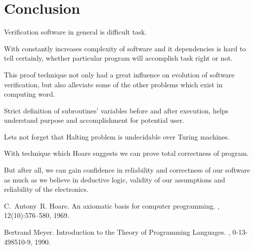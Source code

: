 \documentclass[twoside,twocolumn]{article}
\begin{document}
\section{Conclusion}

Verification software in general is difficult task.

With constantly increases complexity of software and it dependencies is hard to
tell certainly, whether particular program will accomplish task right or not. 

This proof technique not only had a great influence on evolution of software
verification, but also alleviate some of the other problems which exist in
computing word.

Strict definition of subroutines' variables before and after execution, helps
understand purpose and accomplishment for potential user.

Lets not forget that Halting problem is undecidable over Turing machines.

With technique which Hoare suggests we can prove total correctness of program.

But after all, we can gain confidence in reliability and correctness of our
software as much as we believe in deductive logic, validity of our
assumptions and reliability of the electronics.

\begin{thebibliography}{99} %

C.~Antony~R. Hoare.
\newblock An axiomatic basis for computer programming.
, 12(10):576--580, 1969.

Bertrand Meyer.
\newblock Introduction to the Theory of Programming Languages.
, 0-13-498510-9, 1990.

\end{thebibliography}

\end{document}
